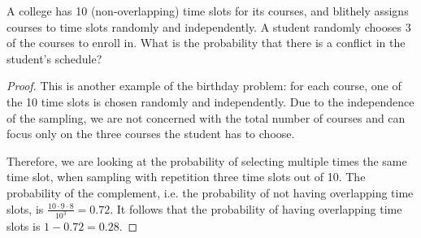 \begin{exercise}{26}
A college has 10 (non-overlapping) time slots for its courses, and blithely assigns courses to time slots randomly and independently. A student randomly chooses 3 of the courses to enroll in. What is the probability that there is a conflict in the student’s schedule?
\end{exercise}

\begin{proof}
    This is another example of the birthday problem: for each course, one of the 10 time slots is chosen randomly and independently. Due to the independence of the sampling, we are not concerned with the total number of courses and can focus only on the three courses the student has to choose.

    Therefore, we are looking at the probability of selecting multiple times the same time slot, when sampling with repetition three time slots out of 10. The probability of the complement, i.e. the probability of not having overlapping time slots, is $\frac{10 \cdot 9 \cdot 8}{10^3} = 0.72$. It follows that the probability of having overlapping time slots is $1 - 0.72 = 0.28$.
\end{proof}

